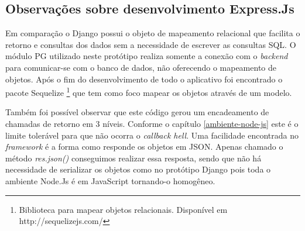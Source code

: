 \subsection{Observações sobre desenvolvimento Express.Js}

  Em comparação o Django possui o objeto de mapeamento relacional que facilita o retorno e consultas dos dados sem a necessidade
  de escrever as consultas SQL. O módulo PG utilizado neste protótipo realiza somente a conexão com o \textit{backend} para comunicar-se com o 
  banco de dados, não oferecendo o mapeamento de objetos. Após o fim do desenvolvimento de todo o aplicativo foi encontrado o
  pacote Sequelize \footnote[13]{Biblioteca para mapear objetos relacionais. Disponível em http://sequelizejs.com/} que tem como 
  foco mapear os objetos através de um modelo.
  
  Também foi possível observar que este código gerou um encadeamento de chamadas de retorno em 3 níveis. Conforme o capítulo \ref{ambiente-node-js}
  este é o limite tolerável para que não ocorra o \textit{callback hell}. Uma facilidade encontrada no \textit{framework} é a forma como responde
  os objetos em JSON. Apenas chamado o método \textit{res.json()} conseguimos realizar essa resposta, sendo que não há necessidade de serializar
  os objetos como no protótipo Django pois toda o ambiente Node.Js é em JavaScript tornando-o homogêneo.